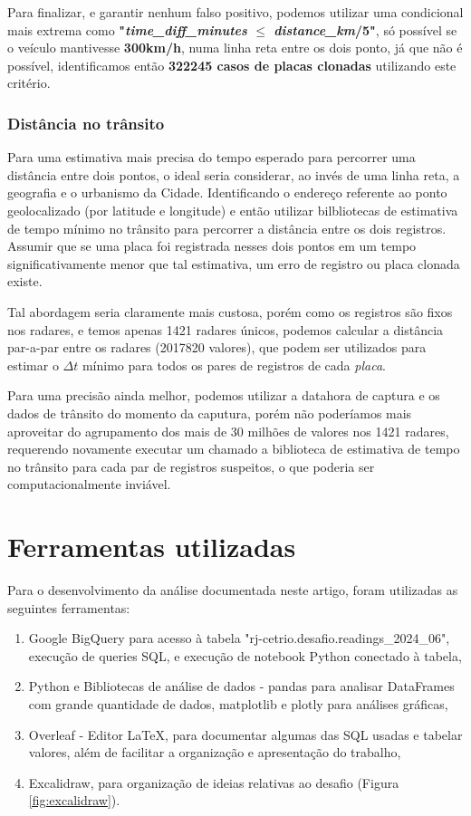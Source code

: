 \documentclass{article}
\begin{document}
Para finalizar, e garantir nenhum falso positivo, podemos utilizar uma condicional mais extrema como \textbf{"\textit{time\_diff\_minutes} $ \leq $ \textit{distance\_km}/5"}, só possível se o veículo mantivesse \textbf{300km/h}, numa linha reta entre os dois ponto, já que não é possível, identificamos então \textbf{322245 casos de placas clonadas} utilizando este critério.

\subsubsection{Distância no trânsito}

Para uma estimativa mais precisa do tempo esperado para percorrer uma distância entre dois pontos, o ideal seria considerar, ao invés de uma linha reta, a geografia e o urbanismo da Cidade. Identificando o endereço referente ao ponto geolocalizado (por latitude e longitude) e então utilizar bilbliotecas de estimativa de tempo mínimo no trânsito para percorrer a distância entre os dois registros. Assumir que se uma placa foi registrada nesses dois pontos em um tempo significativamente menor que tal estimativa, um erro de registro ou placa clonada existe.

Tal abordagem seria claramente mais custosa, porém como os registros são fixos nos radares, e temos apenas 1421 radares únicos, podemos calcular a distância par-a-par entre os radares (2017820 valores), que podem ser utilizados para estimar o $\Delta t$ mínimo para todos os pares de registros de cada \textit{placa}.

Para uma precisão ainda melhor, podemos utilizar a datahora de captura e os dados de trânsito do momento da caputura, porém não poderíamos mais aproveitar do agrupamento dos mais de 30 milhões de valores nos 1421 radares, requerendo novamente executar um chamado a biblioteca de estimativa de tempo no trânsito para cada par de registros suspeitos, o que poderia ser computacionalmente inviável.

\section{Ferramentas utilizadas}

Para o desenvolvimento da análise documentada neste artigo, foram utilizadas as seguintes ferramentas:

\begin{enumerate}
\item Google BigQuery para acesso à tabela "rj-cetrio.desafio.readings\_2024\_06", execução de queries SQL, e execução de notebook Python conectado à tabela,
\item Python e Bibliotecas de análise de dados - pandas para analisar DataFrames com grande quantidade de dados, matplotlib e plotly para análises gráficas,
\item Overleaf - Editor LaTeX, para documentar algumas das SQL usadas e tabelar valores, além de facilitar a organização e apresentação do trabalho,
\item Excalidraw, para organização de ideias relativas ao desafio (Figura \ref{fig:excalidraw}).
\end{enumerate}
\end{document}
